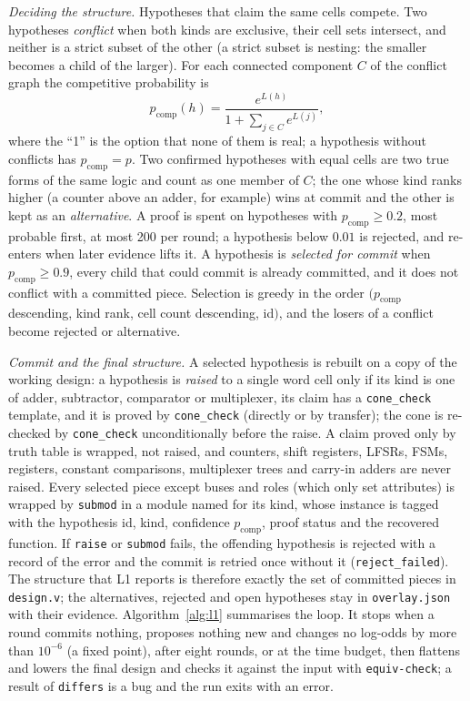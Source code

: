 \documentclass[conference]{IEEEtran}
\newcommand{\code}[1]{\texttt{#1}}
\begin{document}
\emph{Deciding the structure.} Hypotheses that claim the same cells compete. Two hypotheses
\emph{conflict} when both kinds are exclusive, their cell sets intersect, and neither is a
strict subset of the other (a strict subset is nesting: the smaller becomes a child of the
larger). For each connected component $C$ of the conflict graph the competitive probability is
\begin{equation}
p_{\mathrm{comp}}(h)=\frac{e^{L(h)}}{1+\sum_{j\in C}e^{L(j)}},
\label{eq:pcomp}
\end{equation}
where the ``1'' is the option that none of them is real; a hypothesis without conflicts has
$p_{\mathrm{comp}}=p$. Two confirmed hypotheses with equal cells are two true forms of the
same logic and count as one member of $C$; the one whose kind ranks higher (a counter above an
adder, for example) wins at commit and the other is kept as an \emph{alternative}. A proof is
spent on hypotheses with $p_{\mathrm{comp}}\ge 0.2$, most probable first, at most 200 per round;
a hypothesis below $0.01$ is rejected, and re-enters when later evidence lifts it. A hypothesis
is \emph{selected for commit} when $p_{\mathrm{comp}}\ge 0.9$, every child that could commit is
already committed, and it does not conflict with a committed piece. Selection is greedy in
the order $(p_{\mathrm{comp}}$ descending, kind rank, cell count descending, id$)$, and the
losers of a conflict become rejected or alternative.

\emph{Commit and the final structure.} A selected hypothesis is rebuilt on a copy of the
working design: a hypothesis is \emph{raised} to a single word cell only if its kind is one of adder,
subtractor, comparator or multiplexer, its claim has a \code{cone\_check} template, and it is
proved by \code{cone\_check} (directly or by transfer); the cone is re-checked by
\code{cone\_check} unconditionally before the raise. A claim proved only by truth table is
wrapped, not raised, and counters, shift registers, LFSRs, FSMs, registers, constant
comparisons, multiplexer trees and carry-in adders are never raised. Every selected piece
except buses and roles (which only set attributes) is wrapped by \code{submod} in a module
named for its kind, whose instance is tagged with the hypothesis id, kind, confidence
$p_{\mathrm{comp}}$, proof status and the recovered function. If \code{raise} or
\code{submod} fails, the offending hypothesis is rejected with a record of the error and the
commit is retried once without it (\code{reject\_failed}). The structure that L1 reports is
therefore exactly the set of committed pieces in \code{design.v}; the alternatives, rejected
and open hypotheses stay in \code{overlay.json} with their evidence. Algorithm~\ref{alg:l1}
summarises the loop. It stops when a round commits nothing, proposes nothing new and changes
no log-odds by more than $10^{-6}$ (a fixed point), after eight rounds, or at the time
budget, then flattens and lowers the final design and checks it against the input with
\code{equiv-check}; a result of \code{differs} is a bug and the run exits with an error.
\end{document}
